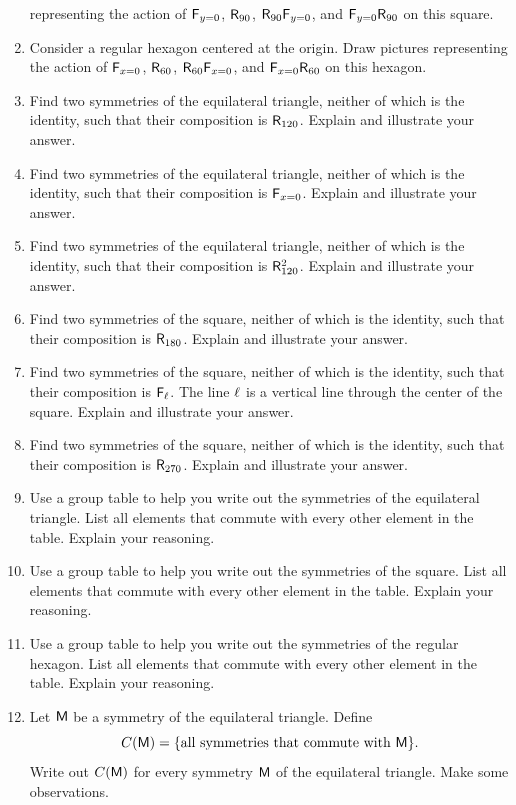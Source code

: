 \begin{enumerate}
  representing the action of $\mathsf{F}_{y=0}$, $\mathsf{R}_{90}$,
  $\mathsf{R}_{90}\mathsf{F}_{y=0}$, and $\mathsf{F}_{y=0} \mathsf{R}_{90}$ on
  this square.
\item Consider a regular hexagon centered at the origin. Draw pictures
  representing the action of $\mathsf{F}_{x=0}$, $\mathsf{R}_{60}$,
  $\mathsf{R}_{60}\mathsf{F}_{x=0}$, and $\mathsf{F}_{x=0} \mathsf{R}_{60}$ on
  this hexagon.
\item Find two symmetries of the equilateral triangle, neither of
  which is the identity, such that their composition is
  $\mathsf{R}_{120}$. Explain and illustrate your answer.
\item Find two symmetries of the equilateral triangle, neither of
  which is the identity, such that their composition is
  $\mathsf{F}_{x=0}$. Explain and illustrate your answer.
\item Find two symmetries of the equilateral triangle, neither of
  which is the identity, such that their composition is
  $\mathsf{R}_{120}^2$. Explain and illustrate your answer.
\item Find two symmetries of the square, neither of which is the
  identity, such that their composition is $\mathsf{R}_{180}$. Explain
  and illustrate your answer.
\item Find two symmetries of the square, neither of which is the
  identity, such that their composition is $\mathsf{F}_{\ell}$.  The line $\ell$ is a vertical line through the center of the square. Explain
  and illustrate your answer.
\item Find two symmetries of the square, neither of which is the
  identity, such that their composition is $\mathsf{R}_{270}$. Explain
  and illustrate your answer.
\item Use a group table to help you write out the symmetries of the
  equilateral triangle. List all elements that commute with every
  other element in the table. Explain your reasoning.
\item Use a group table to help you write out the symmetries of the
  square. List all elements that commute with every other element in
  the table. Explain your reasoning.
\item Use a group table to help you write out the symmetries of the
  regular hexagon. List all elements that commute with every other
  element in the table. Explain your reasoning.
\item Let $\mathsf{M}$ be a symmetry of the equilateral triangle. Define
\[
C(\mathsf{M}) = \{\text{all symmetries that commute with $\mathsf{M}$}\}.
\]
Write out $C(\mathsf{M})$ for every symmetry $\mathsf{M}$ of the equilateral
triangle. Make some observations.
\end{enumerate}

